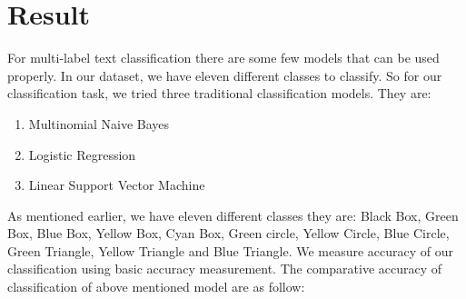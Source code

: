 \chapter{Result}
For multi-label text classification there are some few models that can be used properly. In our dataset, we have eleven different classes to classify. So for our classification task, we tried three traditional classification models. They are:\\

\begin{enumerate}
    \item Multinomial Naive Bayes
    \item Logistic Regression
    \item Linear Support Vector Machine
\end{enumerate}

As mentioned earlier, we have eleven different classes they are: Black Box, Green Box, Blue Box, Yellow Box, Cyan Box, Green circle, Yellow Circle, Blue Circle, Green Triangle, Yellow Triangle and Blue Triangle. We measure accuracy of our classification using basic accuracy measurement. The comparative accuracy of classification of above mentioned model are as follow:\\

